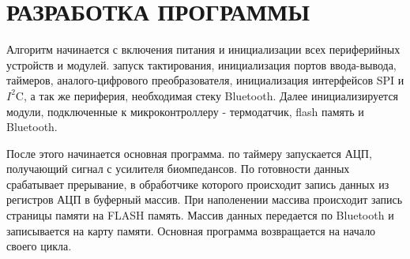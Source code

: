 \begin{sloppypar} %
\newpage %
\section{РАЗРАБОТКА ПРОГРАММЫ} %

Алгоритм начинается с включения питания и инициализации всех периферийных устройств и модулей. запуск тактирования, инициализация портов ввода-вывода, таймеров, аналого-цифрового преобразователя,  инициализация интерфейсов SPI и $I^2$C, а так же периферия, необходимая стеку Bluetooth. Далее инициализируется модули, подключенные к микроконтроллеру - термодатчик, flash память и Bluetooth. 

После этого начинается основная программа. по таймеру запускается АЦП, получающий сигнал с усилителя биомпедансов. По готовности данных срабатывает прерывание, в обработчике которого происходит запись данных из регистров АЦП в буферный массив. При наполенении массива происходит запись страницы памяти на FLASH память.  Массив данных передается по Bluetooth и записывается на карту памяти. Основная программа возвращается на начало своего цикла. 

\end{sloppypar}
